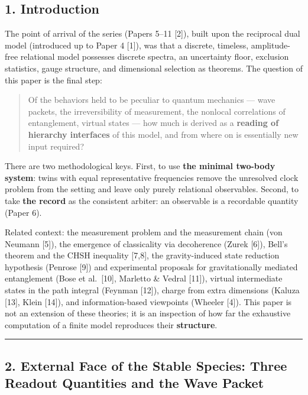 \documentclass[
]{ltjsarticle}
\begin{document}
\subsection{1. Introduction}\label{introduction}

The point of arrival of the series (Papers 5--11 {[}2{]}), built upon
the reciprocal dual model (introduced up to Paper 4 {[}1{]}), was that a
discrete, timeless, amplitude-free relational model possesses discrete
spectra, an uncertainty floor, exclusion statistics, gauge structure,
and dimensional selection as theorems. The question of this paper is the
final step:

\begin{quote}
Of the behaviors held to be peculiar to quantum mechanics --- wave
packets, the irreversibility of measurement, the nonlocal correlations
of entanglement, virtual states --- how much is derived as a
\textbf{reading of hierarchy interfaces} of this model, and from where
on is essentially new input required?
\end{quote}

There are two methodological keys. First, to use \textbf{the minimal
two-body system}: twins with equal representative frequencies remove the
unresolved clock problem from the setting and leave only purely
relational observables. Second, to take \textbf{the record} as the
consistent arbiter: an observable is a recordable quantity (Paper 6).

Related context: the measurement problem and the measurement chain (von
Neumann {[}5{]}), the emergence of classicality via decoherence (Zurek
{[}6{]}), Bell's theorem and the CHSH inequality {[}7,8{]}, the
gravity-induced state reduction hypothesis (Penrose {[}9{]}) and
experimental proposals for gravitationally mediated entanglement (Bose
et al.~{[}10{]}, Marletto \& Vedral {[}11{]}), virtual intermediate
states in the path integral (Feynman {[}12{]}), charge from extra
dimensions (Kaluza {[}13{]}, Klein {[}14{]}), and information-based
viewpoints (Wheeler {[}4{]}). This paper is not an extension of these
theories; it is an inspection of how far the exhaustive computation of a
finite model reproduces their \textbf{structure}.

\begin{center}\rule{0.5\linewidth}{0.5pt}\end{center}

\subsection{2. External Face of the Stable Species: Three Readout
Quantities and the Wave
Packet}\label{external-face-of-the-stable-species-three-readout-quantities-and-the-wave-packet}
\end{document}
